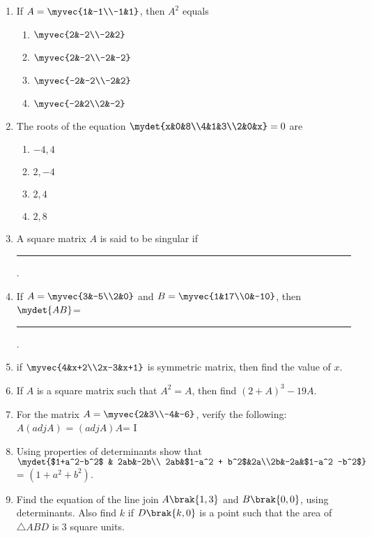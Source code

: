 \documentclass{article}
\begin{document}
\begin{enumerate}
\item If $A=\myvec{1&-1\\-1&1}$, then $A^2$ equals 
	\begin{enumerate}
		\item $\myvec{2&-2\\-2&2}$
		\item $\myvec{2&-2\\-2&-2}$
		\item $\myvec{-2&-2\\-2&2}$
		\item $\myvec{-2&2\\2&-2}$
	\end{enumerate}
\item The roots of the equation $\mydet{x&0&8\\4&1&3\\2&0&x}=0$ are
	\begin{enumerate}
		\item $-4,4$
		\item $2,-4$
		\item $2,4$
		\item $2,8$
	\end{enumerate}
\item A square matrix $A$ is said to be singular if \rule{2cm}{0.15mm}.
\item If $A= \myvec{3&-5\\2&0}$ and $B=\myvec{1&17\\0&-10}$, then $\mydet{AB}$= \rule{2cm}{0.15mm}.
\item if $\myvec{4&x+2\\2x-3&x+1}$ is symmetric matrix, then find the value of $x$.
\item If $A$ is a square matrix such that $A^2=A$, then find $(2+A)^3 -19A$.
\item For the matrix $A=\myvec{2&3\\-4&-6}$, verify the following:
	\\$A(adj A)$ = $(adj A)A$= I
\item Using properties of determinants show that
	\\$\mydet{$1+a^2-b^2$ & 2ab&-2b\\ 2ab&$1-a^2 + b^2$&2a\\2b&-2a&$1-a^2 -b^2$}$ = $(1+a^2+b^2)$.
\item Find the equation of the line join $A\brak{1, 3}$ and $B\brak{0, 0}$, using determinants. Also find $k$ if $D\brak{k,0}$ is a point such that the area of $\triangle ABD$ is $3$ square units.
\end{enumerate}
\end{document}
